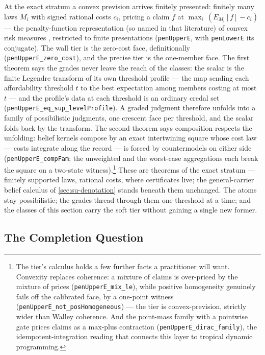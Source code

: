 At the exact stratum a convex prevision arrives finitely
presented: finitely many laws $M_i$ with signed rational costs
$c_i$, pricing a claim $f$ at $\max_i\,(E_{M_i}[f] - c_i)$ --- the
penalty-function representation (so named in that literature) of
convex risk measures
\cite{follmerschied02}, restricted to finite presentations
(\texttt{penUpperE}, with \texttt{penLowerE} its conjugate). The
wall tier is the zero-cost face, definitionally
(\texttt{penUpperE\_zero\_cost}), and the precise tier is the
one-member face. The first theorem says the grades never leave the
reach of the classes: the scalar is the finite Legendre transform
of its own threshold profile --- the map sending each
affordability threshold $t$ to the best expectation among members
costing at most $t$ --- and the profile's data at each threshold
is an ordinary credal set
(\texttt{penUpperE\_eq\_sup\_levelProfile}). A graded judgment
therefore unfolds into a family of possibilistic judgments, one
crescent face per threshold, and the scalar folds back by the
transform. The second theorem says composition respects the
unfolding: belief kernels compose by an exact intertwining
square whose cost law --- costs integrate along the record --- is
forced by countermodels on either side
(\texttt{penUpperE\_compFam}; the unweighted and the worst-case
aggregations each break the square on a two-state
witness).\footnote{The tier's calculus holds a few further facts a
practitioner will want. Convexity replaces coherence: a mixture of
claims is over-priced by the mixture of prices
(\texttt{penUpperE\_mix\_le}), while positive homogeneity
genuinely fails off the calibrated face, by a one-point witness
(\texttt{penUpperE\_not\_posHomogeneous}) --- the tier is
convex-prevision, strictly wider than Walley coherence. And the
point-mass family with a pointwise gate prices claims as a
max-plus contraction (\texttt{penUpperE\_dirac\_family}), the
idempotent-integration reading that connects this layer to
tropical dynamic programming.} These are theorems of the exact
stratum --- finitely supported laws, rational costs, where
certificates live; the general-carrier belief calculus of
\autoref{sec:su-denotation} stands beneath them unchanged. The
atoms stay possibilistic; the grades thread through them one
threshold at a time; and the classes of this section carry the
soft tier without gaining a single new former.

\subsection{The Completion Question}

